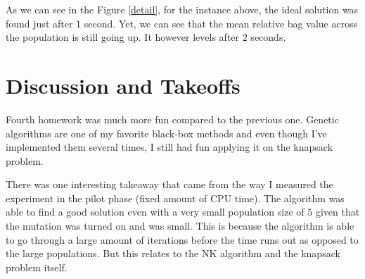 \documentclass[a4paper,10pt]{article}
\begin{document}
As we can see in the Figure \ref{detail}, for the instance above, the ideal solution was found just after $1$ second. Yet, we can see that the mean relative bag value across the population is still going up. It however levels after $2$ seconds.

\clearpage
\section{Discussion and Takeoffs}

Fourth homework was much more fun compared to the previous one. Genetic algorithms are one of my favorite black-box methods and even though I've implemented them several times, I still had fun applying it on the knapsack problem.

There was one interesting takeaway that came from the way I measured the experiment in the pilot phase (fixed amount of CPU time). The algorithm was able to find a good solution even with a very small population size of $5$ given that the mutation was turned on and was small. This is because the algorithm is able to go through a large amount of iterations before the time runs out as opposed to the large populations. But this relates to the NK algorithm and the knapsack problem itself.
\end{document}
